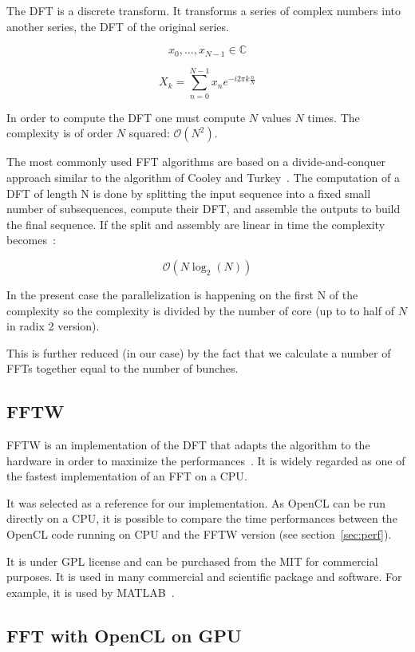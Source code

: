 The \gls{DFT} is a discrete transform. It transforms a series of complex numbers into another series, the \gls{DFT} of the original series.

$$ x_0,...,x_{N -1} \in \mathbb{C} $$

$$ X_{k} = \displaystyle\sum\limits_{n = 0}^{N -1} x_{n}e^{-i 2 \pi k \frac{n}{N}} $$

In order to compute the \gls{DFT} one must compute $N$ values $N$ times. The complexity is of order $N$ squared: $ \mathcal{O}(N^{2}) $.

The most commonly used \gls{FFT} algorithms are based on a divide-and-conquer approach similar to the algorithm of Cooley and Turkey~\cite{Cooley65}. The computation of a \gls{DFT} of length N is done by splitting the input sequence into a fixed small number of subsequences, compute their \gls{DFT}, and assemble the outputs to build the final sequence. If the split and assembly are linear in time the complexity becomes~:

$$ \mathcal{O}(N \log_{2}(N)) $$

In the present case the parallelization is happening on the first N of the complexity so the complexity is divided by the number of core (up to to half of $N$ in radix 2 version). 

This is further reduced (in our case) by the fact that we calculate a number of \glspl{FFT} together equal to the number of bunches.

\subsection{FFTW}

\Gls{FFTW} is an implementation of the \gls{DFT} that adapts the algorithm to the hardware in order to maximize the performances~\cite{fftw05}. It is widely regarded as one of the fastest implementation of an \gls{FFT} on a \gls{CPU}.

It was selected as a reference for our implementation. As \gls{OpenCL} can be run directly on a \gls{CPU}, it is possible to compare the time performances between the \gls{OpenCL} code running on \gls{CPU} and the \gls{FFTW} version (see section~\ref{sec:perf}).

It is under GPL license and can be purchased from the \gls{MIT} for commercial purposes. It is used in many commercial and scientific package and software. For example, it is used by MATLAB~\cite{matlab_fftw}.

\subsection{FFT with OpenCL on GPU}


